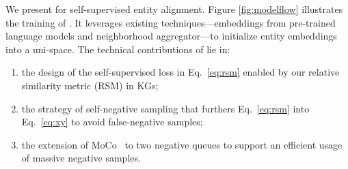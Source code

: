 We present \solution for self-supervised entity alignment.
Figure \ref{fig:modelflow} illustrates the training of \solution. 
It leverages existing techniques---embeddings from pre-trained language models and neighborhood aggregator---to initialize entity embeddings into a uni-space.  
The technical contributions of \solution lie in:
\begin{enumerate}
    \item  the design of the self-supervised loss in Eq.~\ref{eq:rsm} enabled by our relative similarity metric (RSM) in KGs; 
    \item  the strategy of self-negative sampling that furthers Eq.~\ref{eq:rsm} into Eq.~\ref{eq:xy} to avoid false-negative samples; 
    \item the extension of MoCo~\cite{he2020momentum} to two negative queues to support an efficient usage of massive negative samples. 
\end{enumerate}
